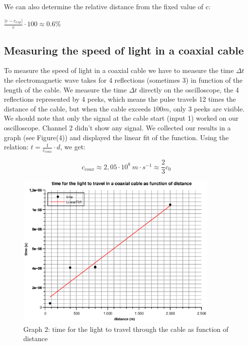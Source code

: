 \documentclass{scrartcl}
\begin{document}
\medskip

We can also determine the relative distance from the fixed value of c:

\begin{center}
$\frac{\vert c - c_{exp}\vert}{c}\cdot 100 \approx 0.6\%$
\end{center}

\subsection{Measuring the speed of light in a coaxial cable}

    To measure the speed of light in a coaxial cable we have to measure the time $\Delta{t}$ the electromagnetic wave takes for 4 reflections (sometimes 3) in function of the length of the cable. We measure the time $\Delta{t}$ directly on the oscilloscope, the 4 reflections represented by 4 peeks, which means the pulse travels 12 times the distance of the cable, but when the cable exceeds $100m$, only 3 peeks are visible. We should note that only the signal at the cable start (input 1) worked on our oscilloscope. Channel 2 didn't show any signal. We collected our results in a graph (see Figure(4)) and displayed the linear fit of the function.
    Using the relation: $t=\frac{1}{c_{coax}}\cdot{d}$, we get:

\begin{equation}
    c_{coax} \approx 2,05\cdot 10^8 \ m\cdot s^{-1} \approx \frac{2}{3}c_0
\end{equation}

\begin{figure}
    \centering
    \includegraphics[width=10cm]{Graph2.eps}
    \caption{Graph 2: time for the light to travel through the cable as function of distance}
    \label{fig:my_label}
\end{figure}
\end{document}
